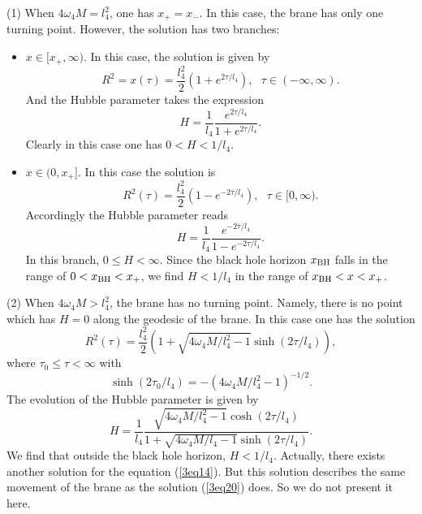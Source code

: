 \documentclass[a4paper,12pt]{article}
\begin{document}
(1) When $4\omega_4 M =l^2_4$, one has $x_+=x_-$.  In this case, the brane 
has only one turning point. However, the solution has
two branches:
\begin{itemize}
\item  $ x \in [x_+,\infty)$. In this case, the solution is given by
   \begin{equation}
   \label{3eq16}
   R^2 =x(\tau)= \frac{l^2_4}{2}\left(1 +e^{2\tau/l_4}\right), \ \
    \ \tau \in (-\infty, \infty).
   \end{equation}
   And the Hubble parameter takes the expression
   \begin{equation}
   H =\frac{1}{l_4}\frac{e^{2\tau/l_4}}{1+e^{2\tau/l_4}}.
   \end{equation}
   Clearly in this case one has $0< H < 1/l_4$.

\item  $x \in (0, x_+]$. In this case the solution is
\begin{equation}
   R^2(\tau) = \frac{l_4^2}{2}\left(1-e^{-2\tau/l_4}\right),
     \ \ \  \tau \in [0, \infty).
\end{equation}
Accordingly the Hubble parameter reads
\begin{equation}
H= \frac{1}{l_4}\frac{e^{-2\tau/l_4}}{1-e^{-2\tau/l_4}}.
\end{equation}
In this branch, $ 0\le H < \infty$.  Since  the
black hole horizon $x_{\rm BH}$ falls in the range of $0 <x_{\rm BH}
< x_+$,  we  find $ H <1/l_4$ in the range of $ x_{\rm BH} < x < x_+$.

\end{itemize}

(2) When $4\omega_4 M > l_4^2$, the brane has no turning point. 
Namely, there is no point which has $H=0$ along the geodesic of 
the brane. In this case one has the solution
    \begin{equation}
   \label{3eq20}
    R^2(\tau)= \frac{l_4^2}{2}\left (1 +\sqrt{4\omega_4M/l_4^2
    -1}\sinh( 2\tau /l_4)\right),
    \end{equation}
    where $\tau_0 \le \tau < \infty$ with
    $$ \sinh(2\tau_0/l_4) =-\left(4\omega_4 M/l_4^2-1
      \right)^{-1/2}.$$
   The evolution of the Hubble parameter is given by
   \begin{equation}
   H
   =\frac{1}{l_4}\frac{\sqrt{4\omega_4M/l_4^2-1}\cosh(2\tau/l_4)}
    {1+\sqrt{4\omega_4M/l_4-1}\sinh(2\tau/l_4)}.
    \end{equation}
 We find that outside the black hole horizon, $H<1/l_4$. Actually, there 
exists another solution for the equation (\ref{3eq14}). But this solution 
describes the same movement of the brane as the solution (\ref{3eq20}) 
does. So we do not present it here. 
\end{document}

